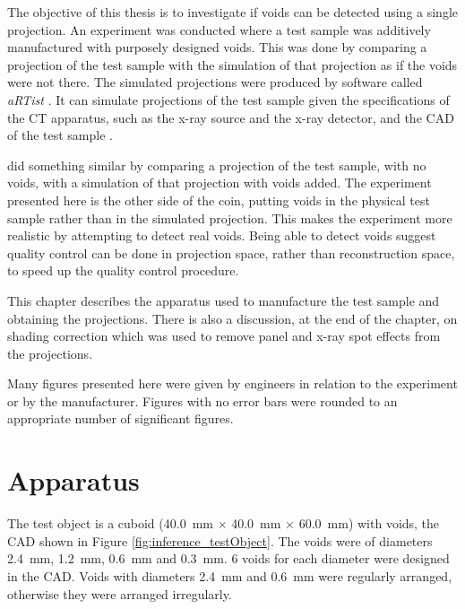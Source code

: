 The objective of this thesis is to investigate if voids can be detected using a single projection. An experiment was conducted where a test sample was additively manufactured with purposely designed voids. This was done by comparing a projection of the test sample with the simulation of that projection as if the voids were not there. The simulated projections were produced by software called \emph{aRTist} \citep{bellon2007artist, jaenisch2008artist, bellon2012radiographic}. It can simulate projections of the test sample given the specifications of the CT apparatus, such as the x-ray source and the x-ray detector, and the CAD of the test sample \citep{bellon2011simulation, deresch2012simulating}.

\cite{brierley2018optimized} did something similar by comparing a projection of the test sample, with no voids, with a simulation of that projection with voids added. The experiment presented here is the other side of the coin, putting voids in the physical test sample rather than in the simulated projection. This makes the experiment more realistic by attempting to detect real voids. Being able to detect voids suggest quality control can be done in projection space, rather than reconstruction space, to speed up the quality control procedure.

This chapter describes the apparatus used to manufacture the test sample and obtaining the projections. There is also a discussion, at the end of the chapter, on shading correction which was used to remove panel and x-ray spot effects from the projections.

Many figures presented here were given by engineers in relation to the experiment or by the manufacturer. Figures with no error bars were rounded to an appropriate number of significant figures.

\section{Apparatus}

The test object is a cuboid (\SI{40.0}{\milli\metre} $\times$ \SI{40.0}{\milli\metre} $\times$ \SI{60.0}{\milli\metre}) with voids, the CAD shown in Figure \ref{fig:inference_testObject}. The voids were of diameters \SI{2.4}{\milli\metre}, \SI{1.2}{\milli\metre}, \SI{0.6}{\milli\metre} and \SI{0.3}{\milli\metre}. 6 voids for each diameter were designed in the CAD. Voids with diameters \SI{2.4}{\milli\metre} and \SI{0.6}{\milli\metre} were regularly arranged, otherwise they were arranged irregularly.

